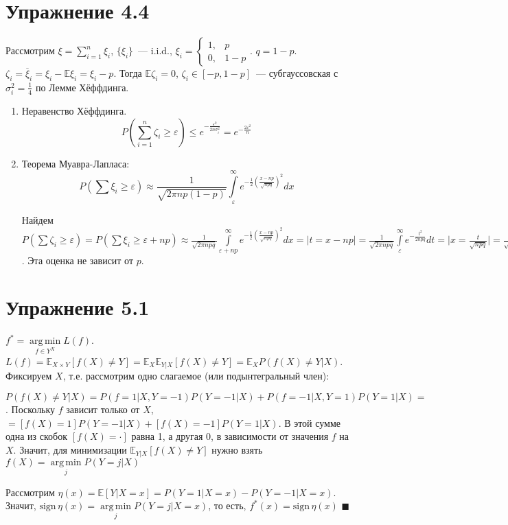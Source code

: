 \documentclass[a4paper]{article}
\DeclareMathOperator*{\argmin}{arg\,min}
\def\eps{\varepsilon}
\begin{document}
\section*{Упражнение 4.4}
Рассмотрим $\xi=\sum\limits_{i=1}^n \xi_i$, $\{\xi_i\}$~--- i.i.d., $\xi_i=\begin{cases}
1,&p\\
0,&1-p
\end{cases}$. $q=1-p$. $\zeta_i=\overline{\xi}_i=\xi_i-\mathbb{E}\xi_i=\xi_i-p$. Тогда $\mathbb{E}\zeta_i=0$, $\zeta_i\in[-p,1-p]$~--- субгауссовская с $\sigma^2_i=\frac{1}{4}$ по Лемме Хёффдинга.
\begin{enumerate}
\item Неравенство Хёффдинга. 
$$P(\sum\limits_{i=1}^n\zeta_i\geqslant \eps)\leqslant e^{-\frac{\eps^2}{2n\sigma_i^2}}=e^{-\frac{2\eps^2}{n}}$$
\item Теорема Муавра-Лапласа: $$P(\sum\xi_i\geqslant\eps)\approx \frac{1}{\sqrt{2\pi np(1-p)}}\int\limits_\eps^\infty e^{-\frac{1}{2}\left(\frac{x-np}{\sqrt{npq}}\right)^2}dx$$

Найдем $P(\sum\zeta_i\geqslant \eps)=P(\sum\xi_i\geqslant \eps+np)\approx\frac{1}{\sqrt{2\pi npq}}\int\limits_{\eps+np}^\infty e^{-\frac{1}{2}\left(\frac{x-np}{\sqrt{npq}}\right)^2}dx=\big|t=x-np\big|=\frac{1}{\sqrt{2\pi npq}}\int\limits_\eps^\infty e^{-\frac{t^2}{2npq}}dt=\big|x=\frac{t}{\sqrt{npq}}\big|=\frac{1}{\sqrt{2\pi}}\int\limits_\eps^\infty e^{-\frac{x^2}{2}}dx$. Эта оценка не зависит от $p$.
\end{enumerate}
\section*{Упражнение 5.1}
$f^*=\argmin\limits_{f\in Y^X} L(f)$. $L(f)=\mathbb{E}_{X\times Y}[f(X)\neq Y]=\mathbb{E}_X\mathbb{E}_{Y|X}[f(X)\neq Y]=\mathbb{E}_X P(f(X)\neq Y\big| X)$. Фиксируем $X$, т.е. рассмотрим одно слагаемое (или подынтегральный член):

$P(f(X)\neq Y\big|X)=P(f=1\big| X,Y=-1)P(Y=-1\big|X)+P(f=-1\big| X,Y=1)P(Y=1\big|X)\boxed{=}$. Поскольку $f$ зависит только от $X$, $\boxed{=}[f(X)=1]P(Y=-1\big|X)+[f(X)=-1]P(Y=1\big|X)$. В этой сумме одна из скобок $[f(X)=\cdot]$ равна 1, а другая 0, в зависимости от значения $f$ на $X$. Значит, для минимизации $\mathbb{E}_{Y|X}[f(X)\neq Y]$ нужно взять $f(X)=\argmin\limits_j P(Y=j\big|X)$

Рассмотрим $\eta(x)=\mathbb{E}[Y|X=x]=P(Y=1\big|X=x)-P(Y=-1\big| X=x)$. Значит, $\mbox{sign}\,\eta(x)=\argmin\limits_j P(Y=j\big| X=x)$, то есть, $f^*(x)=\mbox{sign}\,\eta(x)$ $\blacksquare$
\end{document}
